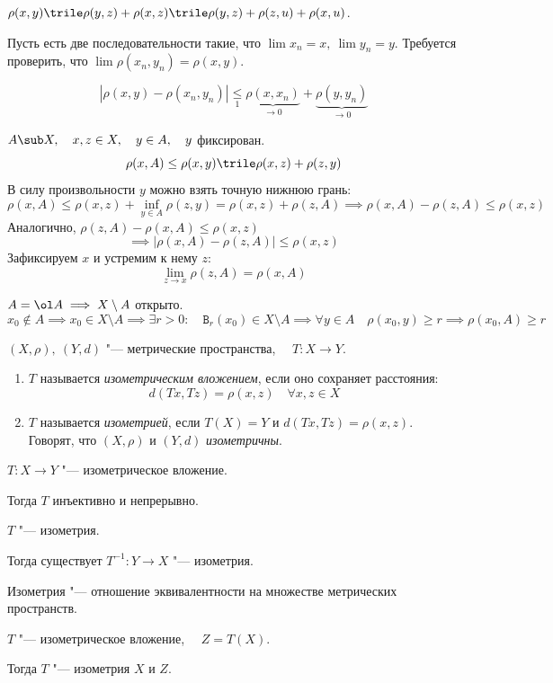 \begin{eproof}
\item $ \rho(x, y) \trile \rho(y, z) + \rho(x, z) \trile \rho(y, z) + \rho(z, u) + \rho(x, u) $.
\item Пусть есть две последовательности такие, что $ \lim x_n = x, ~ \lim y_n = y $.
	Требуется проверить, что $ \lim \rho(x_n, y_n) = \rho(x, y) $.

	$$ |\rho(x, y) - \rho(x_n, y_n)| \underset1\le \underbrace{\rho(x, x_n)}_{\to 0} + \underbrace{\rho(y, y_n)}_{\to 0} $$
\item $ A \sub X, \quad x, z \in X, \quad y \in A, \quad y $ фиксирован.
	$$ \rho(x, A) \le \rho(x, y) \trile \rho(x, z) + \rho(z, y) $$
	В силу произвольности $ y $ можно взять точную нижнюю грань:
	$$ \rho(x, A) \le \rho(x, z) + \inf\limits_{y \in A}\rho(z, y) = \rho(x, z) + \rho(z, A) \implies \rho(x, A) - \rho(z, A) \le \rho(x, z) $$
	Аналогично, $ \rho(z, A) - \rho(x, A) \le \rho(x, z) $
	$$ \implies |\rho(x, A) - \rho(z, A)| \le \rho(x, z) $$
	Зафиксируем $ x $ и устремим к нему $ z $:
	$$ \lim\limits_{z \to x} \rho(z, A) = \rho(x, A) $$
\item $ A = \ol A \implies X \setminus A $ открыто.
	$$ x_0 \notin A \implies x_0 \in X \setminus A \implies
	\exists r > 0 : \quad \mathtt B_r(x_0) \in X \setminus A \implies
	\forall y \in A \quad \rho(x_0, y) \ge r \implies \rho(x_0, A) \ge r $$
\end{eproof}

\begin{definition}
	$ (X, \rho), ~ (Y, d) $ "--- метрические пространства, $ \quad T : X \to Y $.

	\begin{enumerate}
		\item $ T $ называется \emph{изометрическим вложением}, если оно сохраняет расстояния:
			$$ d(Tx, Tz) = \rho(x, z) \quad \forall x, z \in X $$
		\item $ T $ называется \emph{изометрией}, если $ T(X) = Y $ и $ d(Tx, Tz) = \rho(x, z) $.
			Говорят, что $ (X, \rho) $ и $ (Y, d) $ \emph{изометричны}.
	\end{enumerate}
\end{definition}

\begin{props}
\item $ T : X \to Y $ "--- изометрическое вложение.

	Тогда $ T $ инъективно и непрерывно.
\item $ T $ "--- изометрия.

	Тогда существует $ T^{-1} : Y \to X $ "--- изометрия.
\item Изометрия "--- отношение эквивалентности на множестве метрических пространств.
\item $ T $ "--- изометрическое вложение, $ \quad Z = T(X) $.

	Тогда $ T $ "--- изометрия $ X $ и $ Z $.
\end{props}


